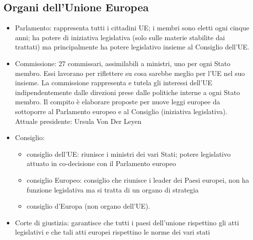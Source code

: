 
\subsection{Organi dell'Unione Europea}
\begin{itemize}
    \item Parlamento: rappresenta tutti i cittadini UE; i membri sono eletti ogni cinque anni; ha potere di iniziativa legislativa (solo sulle materie stabilite dai trattati) ma principalmente ha potere legislativo insieme al Consiglio dell'UE.
    \item Commissione: 27 commissari, assimilabili a ministri, uno per ogni Stato membro. Essi lavorano per riflettere su cosa sarebbe meglio per l'UE nel suo insieme. La commissione rappresenta e tutela gli interessi dell'UE indipendentemente dalle direzioni prese dalle politiche interne a ogni Stato membro. Il compito è elaborare proposte per nuove leggi europee da sottoporre al Parlamento europeo e al Consiglio (iniziativa legislativa). Attuale presidente: Ursula Von Der Leyen
    \item Consiglio: 
    \begin{itemize}
        \item consiglio dell'UE: riunisce i ministri dei vari Stati; potere legislativo attuato in co-decisione con il Parlamento europeo
        \item consiglio Europeo: consiglio che riunisce i leader dei Paesi europei, non ha funzione legislativa ma si tratta di un organo di strategia 
        \item consiglio d'Europa (non organo dell'UE). 
    \end{itemize}
    \item Corte di giustizia: garantisce che tutti i paesi dell'unione rispettino gli atti legislativi e che tali atti europei rispettino le norme dei vari stati
\end{itemize}